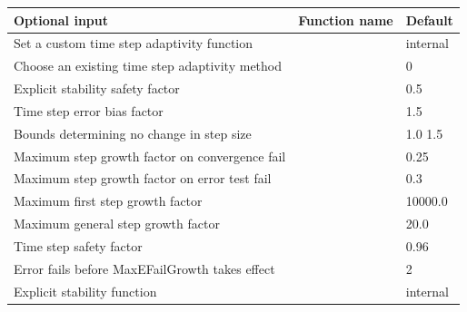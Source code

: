 \documentclass[letterpaper,10pt,english]{sphinxmanual}
\begin{document}
\begin{tabulary}{\linewidth}{|L|L|L|}
\hline
\textbf{\relax 
Optional input
} & \textbf{\relax 
Function name
} & \textbf{\relax 
Default
}\\\hline

Set a custom time step adaptivity function
 & 
{\hyperref[c_interface/User_callable:ARKodeSetAdaptivityFn]{}}
 & 
internal
\\\hline

Choose an existing time step adaptivity method
 & 
{\hyperref[c_interface/User_callable:ARKodeSetAdaptivityMethod]{}}
 & 
0
\\\hline

Explicit stability safety factor
 & 
{\hyperref[c_interface/User_callable:ARKodeSetCFLFraction]{}}
 & 
0.5
\\\hline

Time step error bias factor
 & 
{\hyperref[c_interface/User_callable:ARKodeSetErrorBias]{}}
 & 
1.5
\\\hline

Bounds determining no change in step size
 & 
{\hyperref[c_interface/User_callable:ARKodeSetFixedStepBounds]{}}
 & 
1.0  1.5
\\\hline

Maximum step growth factor on convergence fail
 & 
{\hyperref[c_interface/User_callable:ARKodeSetMaxCFailGrowth]{}}
 & 
0.25
\\\hline

Maximum step growth factor on error test fail
 & 
{\hyperref[c_interface/User_callable:ARKodeSetMaxEFailGrowth]{}}
 & 
0.3
\\\hline

Maximum first step growth factor
 & 
{\hyperref[c_interface/User_callable:ARKodeSetMaxFirstGrowth]{}}
 & 
10000.0
\\\hline

Maximum general step growth factor
 & 
{\hyperref[c_interface/User_callable:ARKodeSetMaxGrowth]{}}
 & 
20.0
\\\hline

Time step safety factor
 & 
{\hyperref[c_interface/User_callable:ARKodeSetSafetyFactor]{}}
 & 
0.96
\\\hline

Error fails before MaxEFailGrowth takes effect
 & 
{\hyperref[c_interface/User_callable:ARKodeSetSmallNumEFails]{}}
 & 
2
\\\hline

Explicit stability function
 & 
{\hyperref[c_interface/User_callable:ARKodeSetStabilityFn]{}}
 & 
internal
\\\hline
\end{tabulary}
\end{document}
